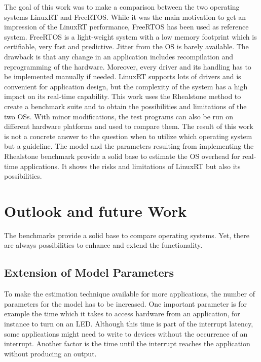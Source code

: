 The goal of this work was to make a comparison between the two operating systems LinuxRT and FreeRTOS. 
While it was the main motivation to get an impression of the LinuxRT performance, FreeRTOS has been used as reference system.
FreeRTOS is a light-weight system with a low memory footprint which is certifiable, very fast and predictive. 
Jitter from the \ac{OS} is barely available. 
The drawback is that any change in an application includes recompilation and reprogramming of the hardware.
Moreover, every driver and its handling has to be implemented manually if needed.
LinuxRT supports lots of drivers and is convenient for application design, but the complexity of the system has a high impact on its real-time capability.
This work uses the Rhealstone method to create a benchmark suite and to obtain the possibilities and limitations of the two \acp{OS}.
With minor modifications, the test programs can also be run on different hardware platforms and used to compare them.
The result of this work is not a concrete answer to the question when to utilize which operating system but a guideline.
The model and the parameters resulting from implementing the Rhealstone benchmark provide a solid base to estimate the \ac{OS} overhead for real-time applications. 
It shows the risks and limitations of LinuxRT but also its possibilities. 

\section{Outlook and future Work}
The benchmarks provide a solid base to compare operating systems.
Yet, there are always possibilities to enhance and extend the functionality.

\subsection{Extension of Model Parameters}
To make the estimation technique available for more applications, the number of parameters for the model has to be increased. 
One important parameter is for example the time which it takes to access hardware from an application, for instance to turn on an \ac{LED}. 
Although this time is part of the interrupt latency, some applications might need to write to devices without the occurrence of an interrupt.
Another factor is the time until the interrupt reaches the application without producing an output. 

